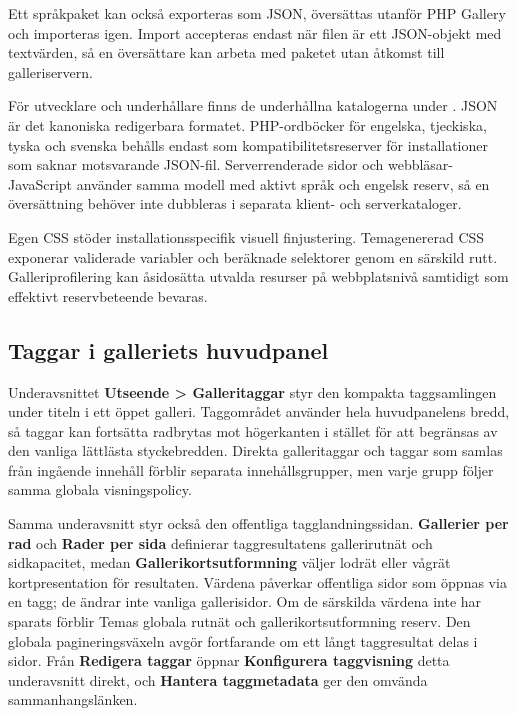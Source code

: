 \documentclass[11pt,a4paper]{article}
\newcommand{\filepath}[1]{\path{#1}}
\newcommand{\ui}[1]{\textbf{#1}}
\begin{document}
Ett språkpaket kan också exporteras som JSON, översättas utanför PHP Gallery och
importeras igen. Import accepteras endast när filen är ett JSON-objekt med
textvärden, så en översättare kan arbeta med paketet utan åtkomst till
galleriservern.

För utvecklare och underhållare finns de underhållna katalogerna under
\filepath{app/lang/}. JSON är det kanoniska redigerbara formatet. PHP-ordböcker
för engelska, tjeckiska, tyska och svenska behålls endast som
kompatibilitetsreserver för installationer som saknar motsvarande JSON-fil.
Serverrenderade sidor och webbläsar-JavaScript använder samma modell med aktivt
språk och engelsk reserv, så en översättning behöver inte dubbleras i separata
klient- och serverkataloger.

Egen CSS stöder installationsspecifik visuell finjustering. Temagenererad CSS
exponerar validerade variabler och beräknade selektorer genom en särskild rutt.
Galleriprofilering kan åsidosätta utvalda resurser på webbplatsnivå samtidigt
som effektivt reservbeteende bevaras.

\subsection{Taggar i galleriets huvudpanel}

Underavsnittet \ui{Utseende > Galleritaggar} styr den kompakta taggsamlingen
under titeln i ett öppet galleri. Taggområdet använder hela huvudpanelens bredd,
så taggar kan fortsätta radbrytas mot högerkanten i stället för att begränsas av
den vanliga lättlästa styckebredden. Direkta galleritaggar och taggar som samlas
från ingående innehåll förblir separata innehållsgrupper, men varje grupp följer
samma globala visningspolicy.

Samma underavsnitt styr också den offentliga tagglandningssidan. \ui{Gallerier
per rad} och \ui{Rader per sida} definierar taggresultatens gallerirutnät och
sidkapacitet, medan \ui{Gallerikortsutformning} väljer lodrät eller vågrät
kortpresentation för resultaten. Värdena påverkar offentliga sidor som öppnas
via en tagg; de ändrar inte vanliga gallerisidor. Om de särskilda värdena inte
har sparats förblir Temas globala rutnät och gallerikortsutformning reserv. Den
globala pagineringsväxeln avgör fortfarande om ett långt taggresultat delas i
sidor. Från \ui{Redigera taggar} öppnar \ui{Konfigurera taggvisning} detta
underavsnitt direkt, och \ui{Hantera taggmetadata} ger den omvända
sammanhangslänken.
\end{document}
